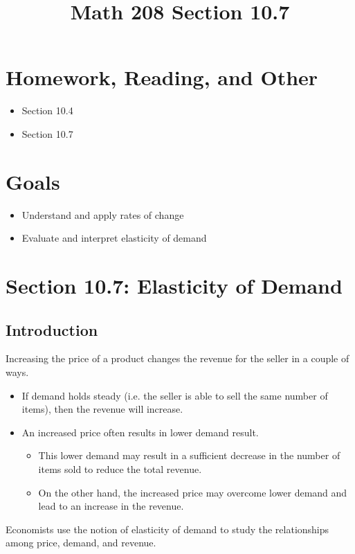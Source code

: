 \documentclass[14pt]{extarticle}
\title{\vspace{-5ex}Math 208 Section 10.7}
\date{\vspace{-10ex}}
\begin{document}
	\maketitle
	
\section{Homework, Reading, and Other}
\begin{itemize}
	\item Section 10.4
	\item Section 10.7
\end{itemize}

\section{Goals}
\begin{itemize}
	\item Understand and apply rates of change
	\item Evaluate  and interpret elasticity of demand
\end{itemize}

\section{Section 10.7:  Elasticity of Demand}
\subsection{Introduction}
Increasing the price of a product changes the revenue for the seller in a couple of ways.
\begin{itemize}
	\item If demand holds steady (i.e. the seller is able to sell the same number of items), then the revenue will increase.
	\item An increased price often results in lower demand result.
	\begin{itemize}
		\item This lower demand may result in a sufficient decrease in the number of items sold to reduce the total revenue.
		\item On the other hand, the increased price may overcome lower demand and lead to an increase in the revenue.
	\end{itemize} 
\end{itemize}
Economists use the notion of elasticity of demand to study the relationships among price, demand, and revenue.
\end{document}
